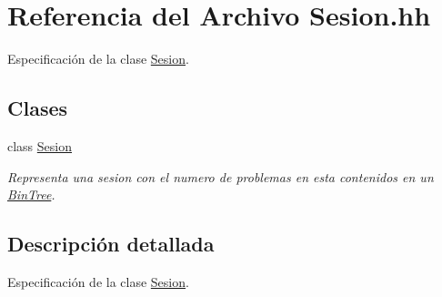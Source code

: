 \hypertarget{_sesion_8hh}{}\section{Referencia del Archivo Sesion.\+hh}
\label{_sesion_8hh}


Especificación de la clase \mbox{\hyperlink{class_sesion}{Sesion}}.  


\subsection*{Clases}
\begin{DoxyCompactItemize}
\item 
class \mbox{\hyperlink{class_sesion}{Sesion}}
\begin{DoxyCompactList}\small\item\em Representa una sesion con el numero de problemas en esta contenidos en un \mbox{\hyperlink{class_bin_tree}{Bin\+Tree}}. \end{DoxyCompactList}\end{DoxyCompactItemize}


\subsection{Descripción detallada}
Especificación de la clase \mbox{\hyperlink{class_sesion}{Sesion}}. 

